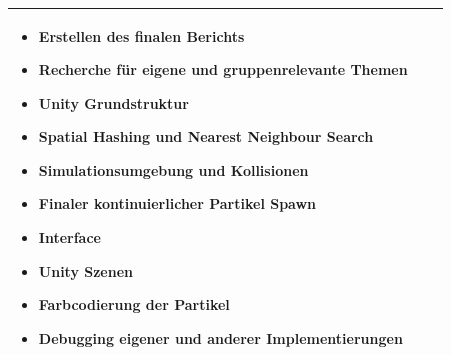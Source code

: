 \documentclass[a4paper]{paper}
\begin{document}
\begin{center}
\begin{tabularx}{\textwidth}{ 
		| >{\raggedright\arraybackslash}X 
		| >{\raggedright\arraybackslash}X 
		| >{\raggedright\arraybackslash}X | }
\begin{itemize}
\item Erstellen des finalen Berichts
\item Recherche für eigene und gruppenrelevante Themen
\item Unity Grundstruktur
\item Spatial Hashing und Nearest Neighbour Search
\item Simulationsumgebung und Kollisionen
\item Finaler kontinuierlicher Partikel Spawn
\item Interface
\item Unity Szenen
\item Farbcodierung der Partikel
\item Debugging eigener und anderer Implementierungen
\end{itemize}
\\
\hline

\end{tabularx}
\end{center}

\end{document}
